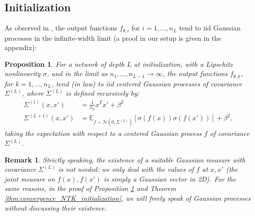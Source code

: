 \documentclass{article}
\newtheorem{prop}{Proposition}
\newtheorem{rem}{Remark}
\begin{document}
\subsection{Initialization}
As observed in \cite{Neal1996,Daniely, Matthews2017GaussianProcess,Lee2017,Matthews2018GaussianProcess}, the output functions $f_{\theta, i}$ for $i=1, ..., n_L$ tend to iid Gaussian processes in the infinite-width limit (a proof in our setup is given in the appendix):
\begin{prop}\label{prop:output_limit}
For a network of depth $L$ at initialization, with a Lipschitz nonlinearity $\sigma$, and in the limit as $n_1, ..., n_{L-1} \to \infty$, the output functions $f_{\theta, k}$, for $k=1, ..., n_L$, tend (in law) to iid centered Gaussian processes of covariance $\Sigma^{(L)}$, where $\Sigma^{(L)}$ is defined recursively by:
\begin{align*}
\Sigma^{(1)}(x, x') &= \frac{1}{n_0} x^T x' + \beta^2 \\
\Sigma^{(L+1)}(x, x') &= \mathbb{E}_{f\sim\mathcal{N}\left(0,\Sigma^{\left(L\right)}\right)}[\sigma(f(x)) \sigma(f(x'))] + \beta^2,
\end{align*}
taking the expectation with respect to a centered Gaussian process $f$ of covariance $\Sigma^{(L)}$.
\end{prop}

\begin{rem} \label{rem:no-problem-with-gauss-meas}
Strictly speaking, the existence of a suitable Gaussian measure with covariance $\Sigma^{(L)}$ is not needed: we only deal with the values of $f$ at $x, x'$ (the joint measure on $f(x), f(x')$ is simply a Gaussian vector in 2D). For the same reasons, in the proof of Proposition \ref{prop:output_limit} and Theorem \ref{thm:convergence_NTK_initialization}, we will freely speak of Gaussian processes without discussing their existence.
\end{rem}
\end{document}
